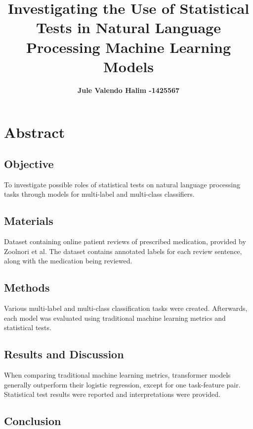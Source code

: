 \documentclass[10.7pt, onecolumn]{article}
\title{\vspace{-2em} Investigating the Use of Statistical Tests in Natural Language Processing Machine Learning Models}
\author[ ]{\bf\fontsize{13}{14}\selectfont Jule Valendo Halim -1425567\vspace{-.7em}}
\affil[ ]{\bf\fontsize{13}{14}\selectfont University of Melbourne}
\date{} %
\begin{document}
\maketitle
\vspace{-4em} %

\section{Abstract}\label{abstract}
\subsection{Objective}

To investigate possible roles of statistical tests on natural language processing tasks through models for multi-label and multi-class classifiers.
\subsection{Materials}

Dataset containing online patient reviews of prescribed medication, provided by Zoolnori et al\cite{psyTAR1}\cite{psyTar2}. The dataset contains annotated labels for each review sentence, along with the medication being reviewed.
\subsection{Methods}

Various multi-label and multi-class classification tasks were created. Afterwards, each model was evaluated using traditional machine learning metrics and statistical tests.


\subsection{Results and Discussion}

When comparing traditional machine learning metrics, transformer models generally outperform their logistic regression, except for one task-feature pair. Statistical test results were reported and interpretations were provided.

\subsection{Conclusion}
\end{document}
